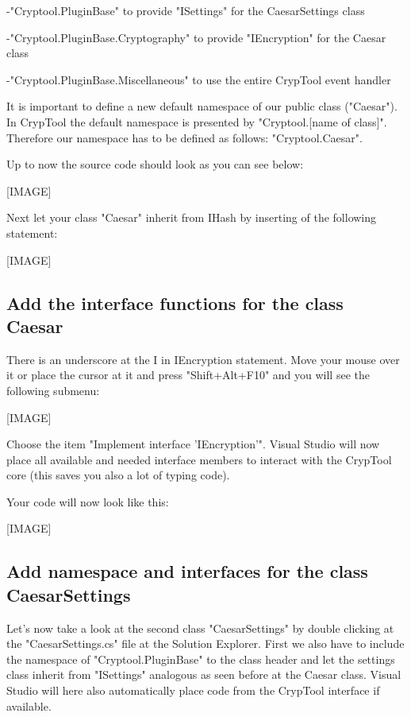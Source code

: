 \hspace{20pt}-"Cryptool.PluginBase" to provide "ISettings" for the CaesarSettings class

\hspace{20pt}-"Cryptool.PluginBase.Cryptography" to provide "IEncryption" for the Caesar class

\hspace{20pt}-"Cryptool.PluginBase.Miscellaneous" to use the entire CrypTool event handler

It is important to define a new default namespace of our public class ("Caesar"). In CrypTool the default namespace is presented by "Cryptool.[name of class]". Therefore our namespace has to be defined as follows: "Cryptool.Caesar".
 
Up to now the source code should look as you can see below:

[IMAGE]

Next let your class "Caesar" inherit from IHash by inserting of the following statement:

[IMAGE]

\subsection{Add the interface functions for the class Caesar}\label{sec:AddTheInterfaceFunctionsForTheClassMD5}
There is an underscore at the I in IEncryption statement. Move your mouse over it or place the cursor at it and press "Shift+Alt+F10" and you will see the following submenu:

[IMAGE]

Choose the item "Implement interface 'IEncryption'". Visual Studio will now place all available and needed interface members to interact with the CrypTool core (this saves you also a lot of typing code).
 
Your code will now look like this: 

[IMAGE]



\subsection{Add namespace and interfaces for the class CaesarSettings}\label{sec:AddNamespaceAndInterfacesForTheClassMD5Settings}
Let's now take a look at the second class "CaesarSettings" by double clicking at the "CaesarSettings.cs" file at the Solution Explorer. First we also have to include the namespace of "Cryptool.PluginBase" to the class header and let the settings class inherit from "ISettings" analogous as seen before at the Caesar class. Visual Studio will here also automatically place code from the CrypTool interface if available.

